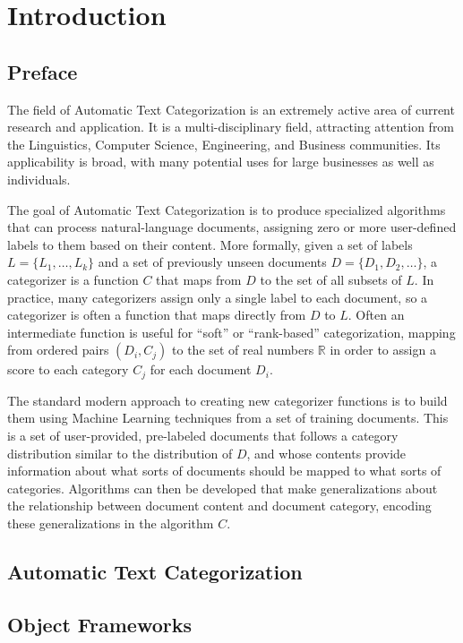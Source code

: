 \chapter{Introduction}

\section{Preface}

The field of Automatic Text Categorization is an extremely active area
of current research and application.  It is a multi-disciplinary
field, attracting attention from the Linguistics, Computer Science,
Engineering, and Business communities.  Its applicability is broad,
with many potential uses for large businesses as well as individuals.

The goal of Automatic Text Categorization is to produce specialized
algorithms that can process natural-language documents, assigning zero
or more user-defined labels to them based on their content.  More
formally, given a set of labels $L = \{L_1, \ldots, L_k\}$ and a set of
previously unseen documents $D = \{D_1, D_2, \ldots \}$, a categorizer is a
function $C$ that maps from $D$ to the set of all subsets of $L$.  In
practice, many categorizers assign only a single label to each
document, so a categorizer is often a function that maps directly from
$D$ to $L$.  Often an intermediate function is useful for ``soft'' or 
``rank-based'' categorization, mapping from ordered pairs $(D_i, C_j)$ 
to the set of real numbers $\mathbb{R}$ in order to assign a score 
to each category $C_j$ for each document $D_i$.

The standard modern approach to creating new categorizer functions is
to build them using Machine Learning techniques from a set of training
documents.  This is a set of user-provided, pre-labeled documents that
follows a category
distribution similar to the distribution of $D$, and whose contents
provide information about what sorts of documents should be mapped to
what sorts of categories.  Algorithms can then be developed that make
generalizations about the relationship between document content and
document category, encoding these generalizations in the algorithm $C$.

\section{Automatic Text Categorization}

\section{Object Frameworks}

